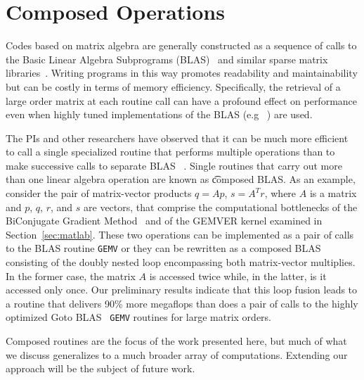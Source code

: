 \documentclass[11pt]{article}
\begin{document}

\section{Composed Operations}
\label{sec:composed}

Codes based on matrix algebra are generally constructed as a sequence of calls to the Basic Linear Algebra Subprograms (BLAS)~\cite{Dongarra:1988uq,Lawson:1979kx,Dongarra:1990fk} and similar sparse matrix libraries~\cite{Saad:fr,George:1981uq}. Writing programs in this way promotes readability and maintainability but can be costly in terms of memory efficiency. Specifically, the retrieval of a large order matrix at each routine call can have a profound effect on performance even when highly tuned implementations of the BLAS (e.g ~\cite{Bilmes:1997ye,Whaley:1998fk,IntelMath:oq,ESSL:kl,Goto:2006fk}) are used.

The PIs and other researchers have observed that it can be much more efficient to call a single specialized routine that performs multiple operations than to make successive calls to separate BLAS ~\cite{Ashby:uq,Blackford:2002vn,Stanley:CSD-98-992,baker03blgmres,baker03lgmres,Dennis:2005tg,Howell:2008,gropp01,Vuduc:2003kl}.  Single routines that carry out more than one linear algebra operation are known as {\t composed} BLAS. As an example, consider the pair of matrix-vector products $q  = Ap$, $s  = A^Tr$, where $A$ is a matrix and $p$, $q$, $r$, and $s$ are vectors, that comprise the computational
bottlenecks of the BiConjugate Gradient Method~\cite{Barrett:1994kx,Saad:2003fk}  and of the GEMVER kernel examined in Section~\ref{sec:matlab}.   These two operations can be implemented as a pair of calls to the BLAS routine {\tt GEMV} or they can be rewritten as a composed BLAS consisting of the doubly nested loop encompassing both matrix-vector multiplies. In the former case, the matrix $A$ is accessed twice while, in the latter, is it accessed only once. Our preliminary results indicate that this loop fusion leads to a routine that delivers 90\% more megaflops than does a pair of calls to the highly optimized Goto BLAS~\cite{Goto:2006fk} {\tt GEMV} routines for large matrix orders.

Composed routines are the focus of the work presented here, but much of what we discuss generalizes to a much broader array of computations.   Extending our approach will be the subject of future work.
\end{document}
